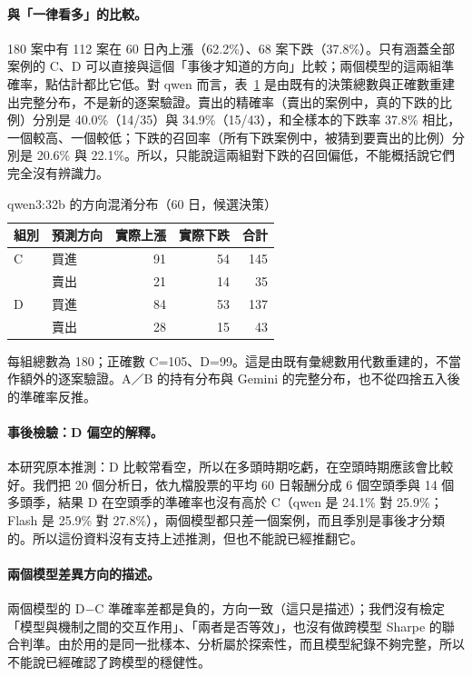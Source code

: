 \documentclass[12pt,a4paper]{article}
\numberwithin{table}{section}
\numberwithin{figure}{section}
\newcommand{\grp}[1]{\textsf{#1}}
\begin{document}
\paragraph{與「一律看多」的比較。} 180 案中有 112 案在 60 日內上漲（62.2\%）、68 案下跌（37.8\%）。只有涵蓋全部案例的 \grp{C}、\grp{D} 可以直接與這個「事後才知道的方向」比較；兩個模型的這兩組準確率，點估計都比它低。對 qwen 而言，表~\ref{tab:confusion} 是由既有的決策總數與正確數重建出完整分布，不是新的逐案驗證。賣出的精確率（賣出的案例中，真的下跌的比例）分別是 40.0\%（14/35）與 34.9\%（15/43），和全樣本的下跌率 37.8\% 相比，一個較高、一個較低；下跌的召回率（所有下跌案例中，被猜到要賣出的比例）分別是 20.6\% 與 22.1\%。所以，只能說這兩組對下跌的召回偏低，不能概括說它們完全沒有辨識力。

\begin{table}[H]
\centering\small
\caption{qwen3:32b 的方向混淆分布（60 日，候選決策）}
\label{tab:confusion}
\begin{tabular}{@{}llrrr@{}}
\toprule
組別 & 預測方向 & 實際上漲 & 實際下跌 & 合計 \\
\midrule
\grp{C} & 買進 & 91 & 54 & 145 \\
         & 賣出 & 21 & 14 & 35 \\
\grp{D} & 買進 & 84 & 53 & 137 \\
         & 賣出 & 28 & 15 & 43 \\
\bottomrule
\end{tabular}
\par\smallskip
\raggedright\footnotesize 每組總數為 180；正確數 C=105、D=99。這是由既有彙總數用代數重建的，不當作額外的逐案驗證。A／B 的持有分布與 Gemini 的完整分布，也不從四捨五入後的準確率反推。
\end{table}

\paragraph{事後檢驗：\grp{D} 偏空的解釋。} 本研究原本推測：\grp{D} 比較常看空，所以在多頭時期吃虧，在空頭時期應該會比較好。我們把 20 個分析日，依九檔股票的平均 60 日報酬分成 6 個空頭季與 14 個多頭季，結果 \grp{D} 在空頭季的準確率也沒有高於 \grp{C}（qwen 是 24.1\% 對 25.9\%；Flash 是 25.9\% 對 27.8\%），兩個模型都只差一個案例，而且季別是事後才分類的。所以這份資料沒有支持上述推測，但也不能說已經推翻它。

\paragraph{兩個模型差異方向的描述。} 兩個模型的 \grp{D}$-$\grp{C} 準確率差都是負的，方向一致（這只是描述）；我們沒有檢定「模型與機制之間的交互作用」、「兩者是否等效」，也沒有做跨模型 Sharpe 的聯合判準。由於用的是同一批樣本、分析屬於探索性，而且模型紀錄不夠完整，所以不能說已經確認了跨模型的穩健性。
\end{document}
